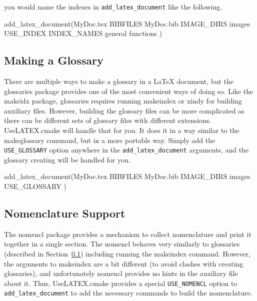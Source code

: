 \documentclass{article}
\newcommand*{\textfile}[1]{\textsf{#1}}
\newcommand*{\textprog}[1]{\textfile{#1}}
\newcommand*{\textlatexpackage}[1]{\textsf{#1}}
\newcommand*{\textcmake}[1]{\texttt{#1}}
\newcommand*{\UseLATEX}{\textfile{UseLATEX.cmake}\xspace}
\newcommand*{\latex}{\LaTeX\xspace}
\newcommand*{\ald}{\textcmake{add\_latex\_document}\xspace}
\begin{document}
  \begin{CodeListing}
\usepackage{multind}
  \end{CodeListing}

  you would name the indexes in \ald like the following.

  \begin{CodeListing}
add_latex_document(MyDoc.tex
  BIBFILES MyDoc.bib
  IMAGE_DIRS images
  USE_INDEX
  INDEX_NAMES general functions
  )
  \end{CodeListing}

  \subsection{Making a Glossary}
  \label{sec:MakingAGlossary}

  There are multiple ways to make a glossary in a \latex document, but the
  \textlatexpackage{glossaries} package provides one of the most convenient
  ways of doing so.  Like the \textlatexpackage{makeidx} package,
  \textlatexpackage{glossaries} requires running \textprog{makeindex} or
  \textprog{xindy} for building auxiliary files.  However, building the
  glossary files can be more complicated as there can be different sets of
  glossary files with different extensions.  \UseLATEX will handle that for
  you.  It does it in a way similar to the \textprog{makeglossary} command,
  but in a more portable way.  Simply add the \textcmake{USE\_GLOSSARY}
  option anywhere in the \ald arguments, and the glossary creating will be
  handled for you.

  \begin{CodeListing}
add_latex_document(MyDoc.tex
  BIBFILES MyDoc.bib
  IMAGE_DIRS images
  USE_GLOSSARY
  )
  \end{CodeListing}

  \subsection{Nomenclature Support}
  \label{sec:NomenclatureSupport}

  The \textlatexpackage{nomencl} package provides a mechanism to collect
  nomenclature and print it together in a single section.  The
  \textlatexpackage{nomencl} behaves very similarly to
  \textlatexpackage{glossaries} (described in
  Section~\ref{sec:MakingAGlossary}) including running the
  \textprog{makeindex} command.  However, the arguments to
  \textprog{makeindex} are a bit different (to avoid clashes with creating
  glossaries), and unfortunately \textlatexpackage{nomencl} provides no
  hints in the auxiliary file about it.  Thus, \UseLATEX provides a special
  \textcmake{USE\_NOMENCL} option to \ald to add the necessary commands to
  build the nomenclature.
\end{document}
